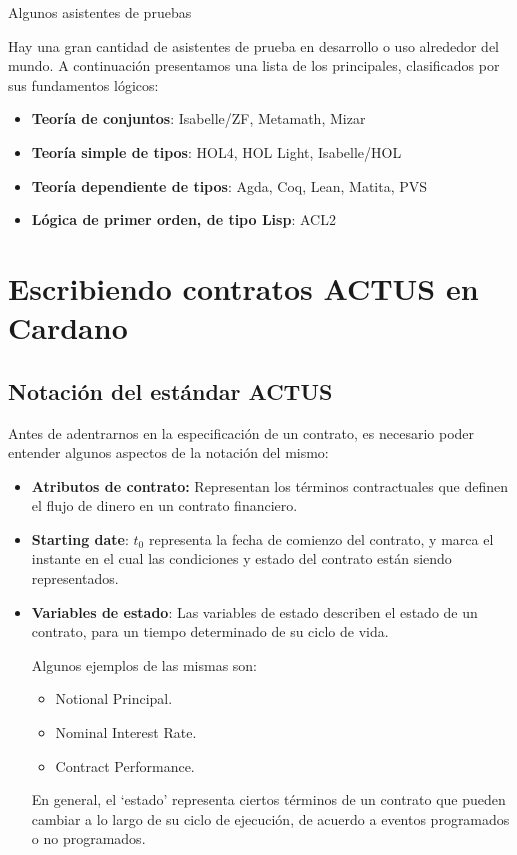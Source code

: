 \documentclass{beamer}
\begin{document}
\begin{frame}{Algunos asistentes de pruebas}

Hay una gran cantidad de asistentes de prueba en desarrollo o uso alrededor del mundo. A
continuación presentamos una lista de los principales, clasificados por sus fundamentos lógicos:
\medskip
\pause

\begin{itemize}
    \item \textbf{Teoría de conjuntos}: Isabelle/ZF, Metamath, Mizar
    \item \textbf{Teoría simple de tipos}: HOL4, HOL Light, Isabelle/HOL
    \item \textbf{Teoría dependiente de tipos}: Agda, Coq, Lean, Matita, PVS
    \item \textbf{Lógica de primer orden, de tipo Lisp}: ACL2
\end{itemize}
\end{frame}

\section{Escribiendo contratos ACTUS en Cardano}

\subsection{Notación del estándar ACTUS}

\begin{frame}
Antes de adentrarnos en la especificación de un contrato, es necesario poder entender algunos
aspectos de la notación del mismo: \pause
\medskip

\begin{itemize}
    \item \textbf{Atributos de contrato:} Representan los términos contractuales que definen el flujo de dinero en un contrato financiero.
    \pause
    \item \textbf{Starting date}: $t_0$ representa la fecha de comienzo del contrato, y marca el instante en el cual las condiciones y estado del contrato están siendo representados. 
    \pause
    \item \textbf{Variables de estado}: Las variables de estado describen el estado de un contrato, para un tiempo determinado de su ciclo de vida. 

        Algunos ejemplos de las mismas son: 
        \pause
            \begin{itemize}
                \item Notional Principal.
                \item Nominal Interest Rate.
                \item Contract Performance.
            \end{itemize}
        \pause
        En general, el ‘estado’ representa ciertos términos de un contrato que pueden cambiar a lo largo de su ciclo de ejecución, de acuerdo a eventos programados o no programados. 
\end{itemize}

\end{frame}
\end{document}
